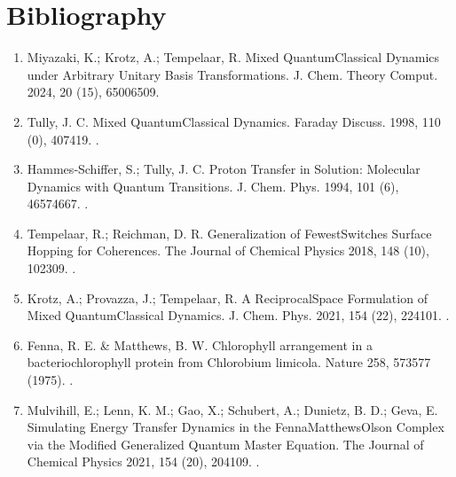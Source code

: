 \documentclass[letterpaper,10pt,english]{sphinxmanual}
\begin{document}
\chapter{Bibliography}
\label{\detokenize{index:bibliography}}\begin{enumerate}
%
\item {} 
\sphinxAtStartPar
Miyazaki, K.; Krotz, A.; Tempelaar, R. Mixed Quantum\sphinxhyphen{}Classical Dynamics under Arbitrary Unitary Basis Transformations. J. Chem. Theory Comput. 2024, 20 (15), 6500\sphinxhyphen{}6509. 

\item {} 
\sphinxAtStartPar
Tully, J. C. Mixed Quantum\textendash{}Classical Dynamics. Faraday Discuss. 1998, 110 (0), 407\textendash{}419. .

\item {} 
\sphinxAtStartPar
Hammes‐Schiffer, S.; Tully, J. C. Proton Transfer in Solution: Molecular Dynamics with Quantum Transitions. J. Chem. Phys. 1994, 101 (6), 4657\textendash{}4667. .

\item {} 
\sphinxAtStartPar
Tempelaar, R.; Reichman, D. R. Generalization of Fewest\sphinxhyphen{}Switches Surface Hopping for Coherences. The Journal of Chemical Physics 2018, 148 (10), 102309. .

\item {} 
\sphinxAtStartPar
Krotz, A.; Provazza, J.; Tempelaar, R. A Reciprocal\sphinxhyphen{}Space Formulation of Mixed Quantum\textendash{}Classical Dynamics. J. Chem. Phys. 2021, 154 (22), 224101. .

\item {} 
\sphinxAtStartPar
Fenna, R. E. \& Matthews, B. W. Chlorophyll arrangement in a bacteriochlorophyll protein from Chlorobium limicola. Nature 258, 573\textendash{}577 (1975). .

\item {} 
\sphinxAtStartPar
Mulvihill, E.; Lenn, K. M.; Gao, X.; Schubert, A.; Dunietz, B. D.; Geva, E. Simulating Energy Transfer Dynamics in the Fenna\textendash{}Matthews\textendash{}Olson Complex via the Modified Generalized Quantum Master Equation. The Journal of Chemical Physics 2021, 154 (20), 204109. .

\end{enumerate}


\renewcommand{\indexname}{Python Module Index}
\begin{sphinxtheindex}
\let\bigletter\sphinxstyleindexlettergroup
\bigletter{q}
\item\relax{}
\end{sphinxtheindex}

\renewcommand{\indexname}{Index}
\printindex
\end{document}
